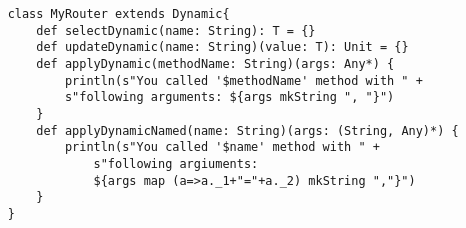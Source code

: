 \begin{verbatim}
    class MyRouter extends Dynamic{
        def selectDynamic(name: String): T = {}
        def updateDynamic(name: String)(value: T): Unit = {}
        def applyDynamic(methodName: String)(args: Any*) {
            println(s"You called '$methodName' method with " +
            s"following arguments: ${args mkString ", "}")
        }
        def applyDynamicNamed(name: String)(args: (String, Any)*) {
            println(s"You called '$name' method with " +
                s"following argiuments: 
                ${args map (a=>a._1+"="+a._2) mkString ","}")
        }
    }
\end{verbatim}